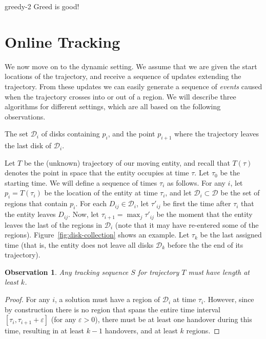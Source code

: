 \documentclass[runningheads]{llncs}
\newcommand {\script} [1] {\ensuremath {\mathcal {#1}}}
\newcommand {\eps} {\varepsilon}
\newcommand{\marrow}{\marginpar[\hfill$\longrightarrow$]{$\longleftarrow$}}
\renewcommand{\remark}[3]{\textcolor{blue}{\textsc{#1 #2:}}
\textcolor{red}{\marrow\textsf{#3}}}
\renewcommand{\remark}[3]{\relax}
\newcommand{\maarten}[2][says]{\remark{Maarten}{#1}{#2}}
\newtheorem {observation}[theorem] {Observation}
\begin{document}
     {greedy-2} {Greed is good!}









\section {Online Tracking} \label {sec:dynamic}

 We now move on to the dynamic setting. We assume that we are given the start locations of the trajectory, and receive a sequence of updates extending the trajectory. From these updates we can easily generate a sequence of \emph{events} caused when the trajectory crosses into or out of a region.
We will describe three algorithms for different settings, which are all based on the following observations.

  \maarten {This would be about the right moment to elaborate some more on competitive ratios.}

    
     {The set $\script D_i$ of disks containing $p_i$, and the point $p_{i+1}$ where the trajectory leaves the last disk of $\script D_i$.}
    
    Let $T$ be the (unknown) trajectory of our moving entity, and recall that $T(\tau)$ denotes the point in space that the entity occupies at time $\tau$.
    Let $\tau_0$ be the starting time. We will define a sequence of times $\tau_i$ as follows. For any $i$, let $p_i = T(\tau_i)$ be the location of the entity at time $\tau_i$, and let $\script D_i \subset \script D$ be the set of regions that contain $p_i$. For each $D_{ij} \in \script D_i$, let $\tau'_{ij} $ be first the time after $\tau_i$ that the entity leaves $D_{ij}$.
    Now, let $\tau_{i+1} = \max_j \tau'_{ij}$ be the moment that the entity leaves the last of the regions in $\script D_i$ (note that it may have re-entered some of the regions).
    Figure~\ref {fig:disk-collection} shows an example.
    Let $\tau_k$ be the last assigned time (that is, the entity does not leave all disks $\script D_k$ before the the end of its trajectory).

    \begin {observation} \label {obs:k}
      Any tracking sequence $S$ for trajectory $T$ must have length at least $k$.
    \end {observation}
    
    \maarten {Not sure this needs a proof...}
    \begin {proof}
      For any $i$, a solution must have a region of $\script D_i$ at time $\tau_i$. However, since by construction there is no region that spans the entire time interval $[\tau_i, \tau_{i+1}+\eps]$ (for any $\eps > 0$), there must be at least one handover during this time, resulting in at least $k-1$ handovers, and at least $k$ regions.
    \end {proof}
\end{document}
